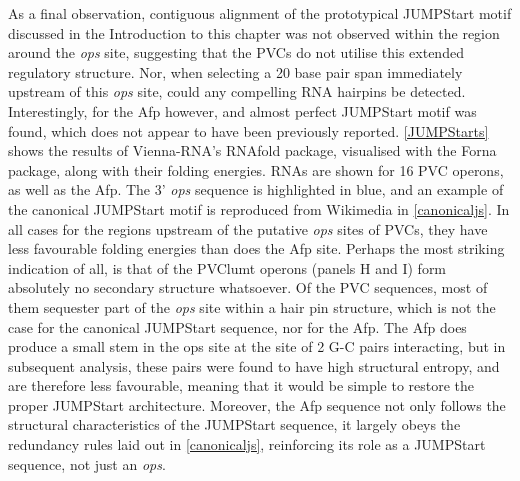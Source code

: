 As a final observation, contiguous alignment of the prototypical JUMPStart motif discussed in the Introduction to this chapter was not observed within the region around the \emph{ops} site, suggesting that the PVCs do not utilise this extended regulatory structure.
Nor, when selecting a 20 base pair span immediately upstream of this \emph{ops} site, could any compelling RNA hairpins be detected. Interestingly, for the Afp however, and almost perfect JUMPStart motif was found, which does not appear to have been previously reported. \vref{JUMPStarts} shows the results of Vienna-RNA's RNAfold package, visualised with the Forna package, along with their folding energies. RNAs are shown for 16 PVC operons, as well as the Afp. The 3' \emph{ops} sequence is highlighted in blue, and an example of the canonical JUMPStart motif is reproduced from Wikimedia in \vref{canonicaljs}. In all cases for the regions upstream of the putative \emph{ops} sites of PVCs, they have less favourable folding energies than does the Afp site. Perhaps the most striking indication of all, is that of the PVClumt operons (panels H and I) form absolutely no secondary structure whatsoever. Of the PVC sequences, most of them sequester part of the \emph{ops} site within a hair pin structure, which is not the case for the canonical JUMPStart sequence, nor for the Afp. The Afp does produce a small stem in the ops site at the site of 2 G-C pairs interacting, but in subsequent analysis, these pairs were found to have high structural entropy, and are therefore less favourable, meaning that it would be simple to restore the proper JUMPStart architecture. Moreover, the Afp sequence not only follows the structural characteristics of the JUMPStart sequence, it largely obeys the redundancy rules laid out in \vref{canonicaljs}, reinforcing its role as a JUMPStart sequence, not just an \emph{ops}.

